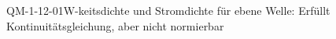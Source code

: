 
\begin{EXA}{QM-1-12-01}{W-keitsdichte und Stromdichte für ebene Welle: Erfüllt Kontinuitätsgleichung, aber nicht normierbar}
\end{EXA}
